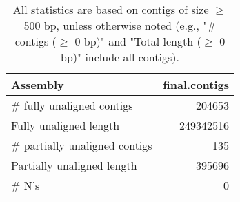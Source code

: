\documentclass[12pt,a4paper]{article}
\begin{document}
\begin{table}[ht]
\begin{center}
\caption{All statistics are based on contigs of size $\geq$ 500 bp, unless otherwise noted (e.g., "\# contigs ($\geq$ 0 bp)" and "Total length ($\geq$ 0 bp)" include all contigs).}
\begin{tabular}{|l*{1}{|r}|}
\hline
Assembly & final.contigs \\ \hline
\# fully unaligned contigs & 204653 \\ \hline
Fully unaligned length & 249342516 \\ \hline
\# partially unaligned contigs & 135 \\ \hline
Partially unaligned length & 395696 \\ \hline
\# N's & 0 \\ \hline
\end{tabular}
\end{center}
\end{table}
\end{document}

